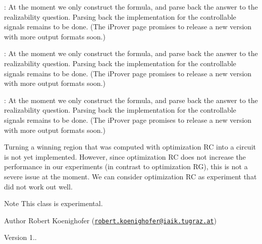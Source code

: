 \begin{DoxyRefList}
\item[\label{todo__todo000005}%
\hypertarget{todo__todo000005}{}%
Member \hyperlink{classEPRSynthesizer_ab5eb613a7e5e4f8d408938531f745e4e}{E\-P\-R\-Synthesizer\-:\-:run} ()]\-: At the moment we only construct the formula, and parse back the answer to the realizability question. Parsing back the implementation for the controllable signals remains to be done. (The i\-Prover page promises to release a new version with more output formats soon.) 
\item[\label{todo__todo000007}%
\hypertarget{todo__todo000007}{}%
Member \hyperlink{classEPRSynthesizer_ad6e1a2eb75383201277345df5ad566a6}{E\-P\-R\-Synthesizer\-:\-:run\-With\-Less\-Skolem} ()]\-: At the moment we only construct the formula, and parse back the answer to the realizability question. Parsing back the implementation for the controllable signals remains to be done. (The i\-Prover page promises to release a new version with more output formats soon.) 
\item[\label{todo__todo000006}%
\hypertarget{todo__todo000006}{}%
Member \hyperlink{classEPRSynthesizer_ad976438a4577ffaa60f696e1c1c03860}{E\-P\-R\-Synthesizer\-:\-:run\-With\-Skolem} ()]\-: At the moment we only construct the formula, and parse back the answer to the realizability question. Parsing back the implementation for the controllable signals remains to be done. (The i\-Prover page promises to release a new version with more output formats soon.) 
\item[\label{todo__todo000008}%
\hypertarget{todo__todo000008}{}%
Class \hyperlink{classLearnSynthQBFInd}{Learn\-Synth\-Q\-B\-F\-Ind} ]Turning a winning region that was computed with optimization R\-C into a circuit is not yet implemented. However, since optimization R\-C does not increase the performance in our experiments (in contrast to optimization R\-G), this is not a severe issue at the moment. We can consider optimization R\-C as experiment that did not work out well. \begin{DoxyNote}{Note}
This class is experimental. 
\end{DoxyNote}
\begin{DoxyAuthor}{Author}
Robert Koenighofer (\href{mailto:robert.koenighofer@iaik.tugraz.at}{\tt robert.\-koenighofer@iaik.\-tugraz.\-at}) 
\end{DoxyAuthor}
\begin{DoxyVersion}{Version}
1..  
\end{DoxyVersion}


\end{DoxyRefList}

